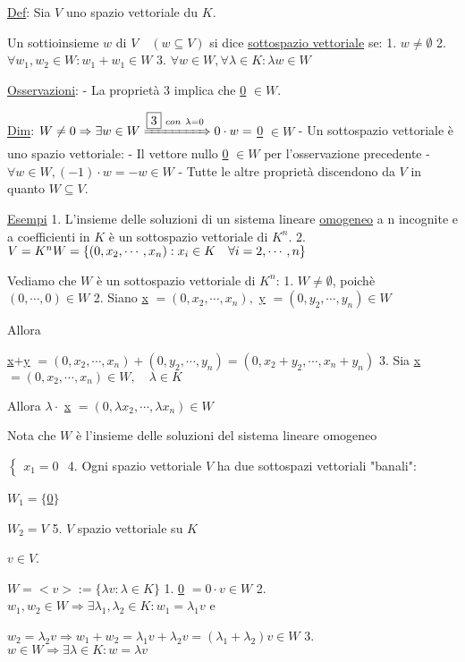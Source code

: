 \documentclass{article}
\begin{document}
\ul{Def}: Sia $V$ uno spazio vettoriale du $K$.

  Un sottioinsieme $w$ di $V\quad(w\subseteq V)$ si dice \ul{sottospazio vettoriale} se:
1. $w\not=\emptyset$
2. $\forall w_1,w_2\in W:w_1+w_1\in W$
3. $\forall w\in W,\forall\lambda\in K:\lambda w\in W$

\ul{Osservazioni}:
- La proprietà 3 implica che \ul{0} $\in W$.

  \ul{Dim}: $W\not=0\Rightarrow\exists w\in W\xRightarrow{\boxed{3}\ con\ \lambda=0}0\cdot w=$ \ul{0} $\in W$
- Un sottospazio vettoriale è uno spazio vettoriale:
    - Il vettore nullo \ul{0} $\in W$ per l'osservazione precedente
    - $\forall w\in W,(-1)\cdot w=-w\in W$
    - Tutte le altre proprietà discendono da $V$ in quanto $W\subseteq V$.

\ul{Esempi}
1. L'insieme delle soluzioni di un sistema lineare \ul{omogeneo} a n incognite e a coefficienti in $K$ è un sottospazio vettoriale di $K^n$.
2. $V=K^n\\W=\{(0,x_2,\cdots,x_n):x_i\in K\quad\forall i=2,\cdots,n\}$

   Vediamo che $W$ è un sottospazio vettoriale di $K^n$:
   1. $W\not=\emptyset$, poichè $(0,\cdots,0)\in W$
   2. Siano \ul{x} $=(0,x_2,\cdots,x_n),$ \ul{y} $=(0,y_2,\cdots,y_n)\in W$

      Allora

      \ul{x}$+$\ul{y} $=(0,x_2,\cdots,x_n)+(0,y_2,\cdots,y_n)=(0,x_2+y_2,\cdots,x_n+y_n)$
  3. Sia \ul{x} $=(0,x_2,\cdots,x_n)\in W,\quad\lambda\in K$

      Allora $\lambda\cdot$ \ul{x} $=(0,\lambda x_2,\cdots,\lambda x_n)\in W$

      Nota che $W$ è l'insieme delle soluzioni del sistema lineare omogeneo

      $\begin{cases}x_1=0\end{cases}$
  4. Ogni spazio vettoriale $V$ ha due sottospazi vettoriali "banali":

      $W_1=\{$\ul{0}$\}$

      $W_2=V$
  5. $V$ spazio vettoriale su $K$

      $v\in V$.

      $W=<v>:=\{\lambda v:\lambda\in K\}$
      1. \ul{0} $=0\cdot v\in W$
      2. $w_1,w_2\in W\Rightarrow\exists\lambda_1,\lambda_2\in K:w_1=\lambda_1v$ e

          $w_2=\lambda_2v\Rightarrow w_1+w_2=\lambda_1v+\lambda_2v=(\lambda_1+\lambda_2)v\in W$
      3. $w\in W\Rightarrow\exists\lambda\in K:w=\lambda v$
\end{document}
